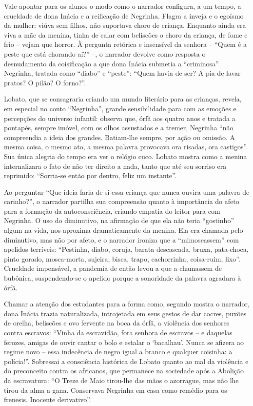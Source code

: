 \documentclass[11pt]{extarticle}
\begin{document}
Vale apontar para os alunos o modo como o narrador configura, a um
tempo, a crueldade de dona Inácia e a reificação de Negrinha. Flagra a
inveja e o egoísmo da mulher: viúva sem filhos, não suportava choro de
criança. Enquanto ainda era viva a mãe da menina, tinha de calar com
beliscões o choro da criança, de fome e frio -- vejam que horror. À
pergunta retórica e insensível da senhora -- ``Quem é a peste que está
chorando aí?'' --, o narrador devolve como resposta o desnudamento da
coisificação a que dona Inácia submetia a ``criminosa'' Negrinha,
tratada como ``diabo'' e ``peste'': ``Quem havia de ser? A pia de lavar
pratos? O pilão? O forno?''.

Lobato, que se consagraria criando um mundo literário para as crianças,
revela, em especial no conto ``Negrinha'', grande sensibilidade para com
as emoções e percepções do universo infantil: observa que, órfã aos
quatro anos e tratada a pontapés, sempre imóvel, com os olhos assustados
e a tremer, Negrinha ``não compreendia a ideia dos grandes. Batiam-lhe
sempre, por ação ou omissão. A mesma coisa, o mesmo ato, a mesma palavra
provocava ora risadas, ora castigos''. Sua única alegria do tempo era
ver o relógio cuco. Lobato mostra como a menina internalizara o fato de
não ter direito a nada, tanto que até seu sorriso era reprimido:
``Sorria-se então por dentro, feliz um instante''.

Ao perguntar ``Que ideia faria de si essa criança que nunca ouvira uma
palavra de carinho?'', o narrador partilha sua compreensão quanto à
importância do afeto para a formação da autoconsciência, criando empatia
do leitor para com Negrinha. O uso do diminutivo, na afirmação de que
ela não teria ``gostinho'' algum na vida, nos aproxima dramaticamente da
menina. Ela era chamada pelo diminutivo, mas não por afeto, e o narrador
ironiza que a ``mimoseassem'' com apelidos terríveis: ``Pestinha, diabo,
coruja, barata descascada, bruxa, pata-choca, pinto gorado, mosca-morta,
sujeira, bisca, trapo, cachorrinha, coisa-ruim, lixo''. Crueldade
impensável, a pandemia de então levou a que a chamassem de bubônica,
suspendendo-se o apelido porque a sonoridade da palavra agradara à órfã.

Chamar a atenção dos estudantes para a forma como, segundo mostra o
narrador, dona Inácia trazia naturalizada, introjetada em seus gestos de
dar cocres, puxões de orelha, beliscões e ovo fervente na boca da órfã,
a violência dos senhores contra escravos: ``Vinha da escravidão, fora
senhora de escravos -- e daquelas ferozes, amigas de ouvir cantar o bolo
e estalar o `bacalhau'. Nunca se afizera ao regime novo -- essa
indecência de negro igual a branco e qualquer coisinha: a polícia!''.
Sobressai a consciência histórica de Lobato quanto ao mal da violência e
do preconceito contra os africanos, que permanece na sociedade após a
Abolição da escravatura: ``O Treze de Maio tirou-lhe das mãos o
azorrague, mas não lhe tirou da alma a gana. Conservava Negrinha em casa
como remédio para os frenesis. Inocente derivativo''.
\end{document}
